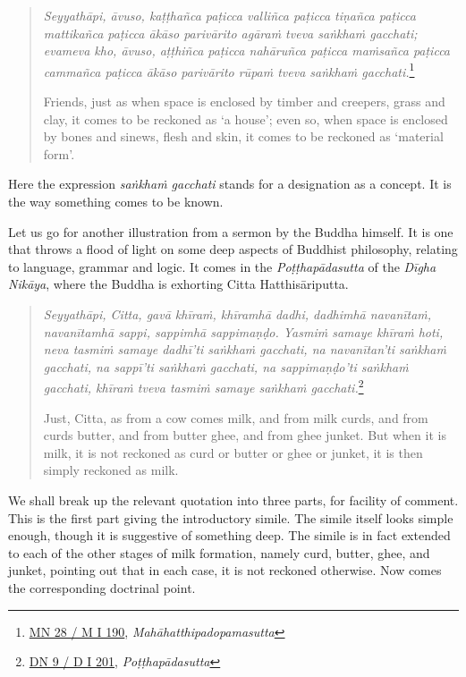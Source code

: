 \begin{quote}
\emph{Seyyathāpi, āvuso, kaṭṭhañca paṭicca valliñca paṭicca tiṇañca paṭicca mattikañca paṭicca ākāso parivārito agāraṁ tveva saṅkhaṁ gacchati; evameva kho, āvuso, aṭṭhiñca paṭicca nahāruñca paṭicca maṁsañca paṭicca cammañca paṭicca ākāso parivārito rūpaṁ tveva saṅkhaṁ gacchati.}\footnote{\href{https://suttacentral.net/mn28/pli/ms}{MN 28 / M I 190}, \emph{Mahāhatthipadopamasutta}}

Friends, just as when space is enclosed by timber and creepers, grass and clay, it comes to be reckoned as `a house'; even so, when space is enclosed by bones and sinews, flesh and skin, it comes to be reckoned as `material form'.
\end{quote}

Here the expression \emph{saṅkhaṁ gacchati} stands for a designation as a concept. It is the way something comes to be known.

Let us go for another illustration from a sermon by the Buddha himself. It is one that throws a flood of light on some deep aspects of Buddhist philosophy, relating to language, grammar and logic. It comes in the \emph{Poṭṭhapādasutta} of the \emph{Dīgha Nikāya}, where the Buddha is exhorting Citta Hatthisāriputta.

\begin{quote}
\emph{Seyyathāpi, Citta, gavā khīraṁ, khīramhā dadhi, dadhimhā navanītaṁ, navanītamhā sappi, sappimhā sappimaṇḍo. Yasmiṁ samaye khīraṁ hoti, neva tasmiṁ samaye dadhī'ti saṅkhaṁ gacchati, na navanītan'ti saṅkhaṁ gacchati, na sappī'ti saṅkhaṁ gacchati, na sappimaṇḍo'ti saṅkhaṁ gacchati, khīraṁ tveva tasmiṁ samaye saṅkhaṁ gacchati.}\footnote{\href{https://suttacentral.net/dn9/pli/ms}{DN 9 / D I 201}, \emph{Poṭṭhapādasutta}}

Just, Citta, as from a cow comes milk, and from milk curds, and from curds butter, and from butter ghee, and from ghee junket. But when it is milk, it is not reckoned as curd or butter or ghee or junket, it is then simply reckoned as milk.
\end{quote}

We shall break up the relevant quotation into three parts, for facility of comment. This is the first part giving the introductory simile. The simile itself looks simple enough, though it is suggestive of something deep. The simile is in fact extended to each of the other stages of milk formation, namely curd, butter, ghee, and junket, pointing out that in each case, it is not reckoned otherwise. Now comes the corresponding doctrinal point.

